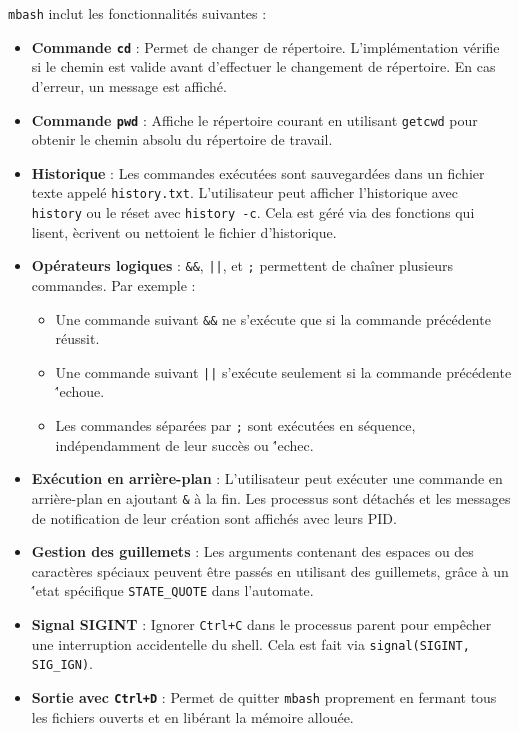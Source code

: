 \documentclass[11pt,a4paper]{article}
\begin{document}
\texttt{mbash} inclut les fonctionnalit\'es suivantes :
\begin{itemize}
    \item \textbf{Commande \texttt{cd}} : Permet de changer de r\'epertoire. L'impl\'ementation v\'erifie si le chemin est valide avant d'effectuer le changement de r\'epertoire. En cas d'erreur, un message est affich\'e.
    \item \textbf{Commande \texttt{pwd}} : Affiche le r\'epertoire courant en utilisant \texttt{getcwd} pour obtenir le chemin absolu du r\'epertoire de travail.
    \item \textbf{Historique} : Les commandes ex\'ecut\'ees sont sauvegard\'ees dans un fichier texte appel\'e \texttt{history.txt}. L'utilisateur peut afficher l'historique avec \texttt{history} ou le r\'eset avec \texttt{history -c}. Cela est g\'er\'e via des fonctions qui lisent, \`ecrivent ou nettoient le fichier d'historique.
    \item \textbf{Op\'erateurs logiques} : \texttt{\&\&}, \texttt{||}, et \texttt{;} permettent de cha\^iner plusieurs commandes. Par exemple :
    \begin{itemize}
        \item Une commande suivant \texttt{\&\&} ne s'ex\'ecute que si la commande pr\'ec\'edente r\'eussit.
        \item Une commande suivant \texttt{||} s'ex\'ecute seulement si la commande pr\'ec\'edente \''echoue.
        \item Les commandes s\'epar\'ees par \texttt{;} sont ex\'ecut\'ees en s\'equence, ind\'ependamment de leur succ\`es ou \''echec.
    \end{itemize}
    \item \textbf{Ex\'ecution en arri\`ere-plan} : L'utilisateur peut ex\'ecuter une commande en arri\`ere-plan en ajoutant \texttt{\&} \`a la fin. Les processus sont d\'etach\'es et les messages de notification de leur cr\'eation sont affich\'es avec leurs PID.
    \item \textbf{Gestion des guillemets} : Les arguments contenant des espaces ou des caract\`eres sp\'eciaux peuvent \^etre pass\'es en utilisant des guillemets, gr\^ace \`a un \''etat sp\'ecifique \texttt{STATE\_QUOTE} dans l'automate.
    \item \textbf{Signal SIGINT} : Ignorer \texttt{Ctrl+C} dans le processus parent pour emp\^echer une interruption accidentelle du shell. Cela est fait via \texttt{signal(SIGINT, SIG\_IGN)}.
    \item \textbf{Sortie avec \texttt{Ctrl+D}} : Permet de quitter \texttt{mbash} proprement en fermant tous les fichiers ouverts et en lib\'erant la m\'emoire allou\'ee.
\end{itemize}
\end{document}
